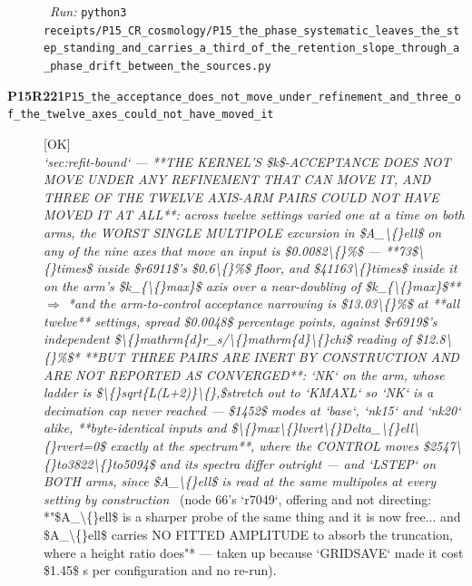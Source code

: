 \begin{description}
\ \emph{Run:} \texttt{python3 receipts/P15\_CR\_cosmology/P15\_the\_phase\_systematic\_leaves\_the\_step\_standing\_and\_carries\_a\_third\_of\_the\_retention\_slope\_through\_a\_phase\_drift\_between\_the\_sources.py}
\item[\rcptlabel{P15_the_acceptance_does_not_move_under_refinement_and_three_of_the_twelve_axes_could_not_have_moved_it}{P15R221}\textbf{P15R221}\quad\texttt{P15\_the\_acceptance\_does\_not\_move\_under\_refinement\_and\_three\_of\_the\_twelve\_axes\_could\_not\_have\_moved\_it}]\hfill\textsf{[OK]}\\
\textit{`sec:refit-bound` --- **THE KERNEL'S \$k\$-ACCEPTANCE DOES NOT MOVE UNDER ANY REFINEMENT THAT CAN MOVE IT, AND THREE OF THE TWELVE AXIS-ARM PAIRS COULD NOT HAVE MOVED IT AT ALL**: across twelve settings varied one at a time on both arms, the WORST SINGLE MULTIPOLE excursion in \$A\_\textbackslash\{\}ell\$ on any of the nine axes that move an input is \$0.0082\textbackslash\{\}\%\$ --- **73\$\textbackslash\{\}times\$ inside \$r6911\$'s \$0.6\textbackslash\{\}\%\$ floor, and \$41163\textbackslash\{\}times\$ inside it on the arm's \$k\_\{\textbackslash\{\}max\}\$ axis over a near-doubling of \$k\_\{\textbackslash\{\}max\}\$** \ensuremath{\Rightarrow} *and the arm-to-control acceptance narrowing is \$13.03\textbackslash\{\}\%\$ at **all twelve** settings, spread \$0.0048\$ percentage points, against \$r6919\$'s independent \$\textbackslash\{\}mathrm\{d\}r\_s/\textbackslash\{\}mathrm\{d\}\textbackslash\{\}chi\$ reading of \$12.8\textbackslash\{\}\%\$*  **BUT THREE PAIRS ARE INERT BY CONSTRUCTION AND ARE NOT REPORTED AS CONVERGED**: `NK` on the arm, whose ladder is \$\textbackslash\{\}sqrt\{L(L+2)\}\textbackslash\{\},\$stretch out to `KMAXL` so `NK` is a decimation cap never reached --- \$1452\$ modes at `base`, `nk15` and `nk20` alike, **byte-identical inputs and \$\textbackslash\{\}max\textbackslash\{\}lvert\textbackslash\{\}Delta\_\textbackslash\{\}ell\textbackslash\{\}rvert=0\$ exactly at the spectrum**, where the CONTROL moves \$2547\textbackslash\{\}to3822\textbackslash\{\}to5094\$ and its spectra differ outright --- and `LSTEP` on BOTH arms, since \$A\_\textbackslash\{\}ell\$ is read at the same multipoles at every setting by construction} \ (node 66's `r7049`, offering and not directing: *"\$A\_\textbackslash\{\}ell\$ is a sharper probe of the same thing and it is now free... and \$A\_\textbackslash\{\}ell\$ carries NO FITTED AMPLITUDE to absorb the truncation, where a height ratio does"* --- taken up because `GRIDSAVE` made it cost \$1.45\$ s per configuration and no re-run). 

\end{description}
